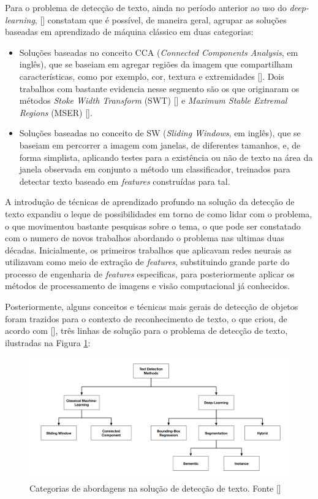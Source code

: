 Para o problema de detecção de texto, ainda no período anterior ao uso do \textit{deep-learning}, [] constatam que é possível, de maneira geral, agrupar as soluções baseadas em aprendizado de máquina clássico em duas categorias:
\begin{itemize}
    \item Soluções baseadas no conceito CCA (\textit{Connected Components Analysis}, em inglês), que se baseiam em agregar regiões da imagem que compartilham características, como por exemplo, cor, textura e extremidades []. Dois trabalhos com bastante evidencia nesse segmento são os que originaram os métodos \textit{Stoke Width Transform} (SWT) [] e \textit{Maximum Stable Extremal Regions} (MSER) [].
    \item Soluções baseadas no conceito de SW (\textit{Sliding Windows}, em inglês), que se baseiam em percorrer a imagem com janelas, de diferentes tamanhos, e, de forma simplista, aplicando testes para a existência ou não de texto na área da janela observada em conjunto a método um classificador, treinados para detectar texto baseado em \textit{features} construídas para tal.
\end{itemize}

A introdução de técnicas de aprendizado profundo na solução da detecção de texto expandiu o leque de possibilidades em torno de como lidar com o problema, o que movimentou bastante pesquisas sobre o tema, o que pode ser constatado com o numero de novos trabalhos abordando o problema nas ultimas duas décadas. Inicialmente, os primeiros trabalhos que aplicavam redes neurais as utilizavam como meio de extração de \textit{features}, substituindo grande parte do processo de engenharia de \textit{features} especificas, para posteriormente aplicar os métodos de processamento de imagens e visão computacional já conhecidos.

Posteriormente, alguns conceitos e técnicas mais gerais de detecção de objetos foram trazidos para o contexto de reconhecimento de texto, o que criou, de acordo com [], três linhas de solução para o problema de detecção de texto, ilustradas na Figura \ref{fig:theory-detection-categories}:

\begin{figure}
    \centering
    \includegraphics[width=\textwidth]{figs/theory-detection-categories.png}
    \caption{Categorias de abordagens na solução de detecção de texto. Fonte []}
    \label{fig:theory-detection-categories}
\end{figure}


